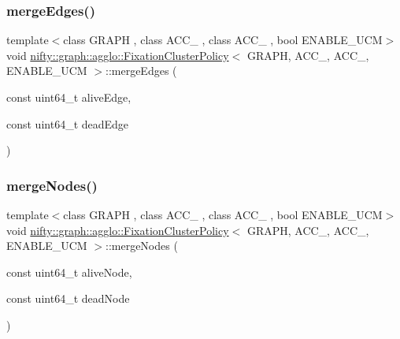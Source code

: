 \mbox{\label{classnifty_1_1graph_1_1agglo_1_1FixationClusterPolicy_a0dab460de96a588b52090cc3d57a6f31}} 
\subsubsection{\texorpdfstring{merge\+Edges()}{mergeEdges()}}
{\footnotesize\ttfamily template$<$class G\+R\+A\+PH , class A\+C\+C\+\_ , class A\+C\+C\+\_ , bool E\+N\+A\+B\+L\+E\+\_\+\+U\+CM$>$ \\
void \hyperlink{classnifty_1_1graph_1_1agglo_1_1FixationClusterPolicy}{nifty\+::graph\+::agglo\+::\+Fixation\+Cluster\+Policy}$<$ G\+R\+A\+PH, A\+C\+C\+\_, A\+C\+C\+\_, E\+N\+A\+B\+L\+E\+\_\+\+U\+CM $>$\+::merge\+Edges (\begin{DoxyParamCaption}\item[{const uint64\+\_\+t}]{alive\+Edge,  }\item[{const uint64\+\_\+t}]{dead\+Edge }\end{DoxyParamCaption})\hspace{0.3cm}{\ttfamily [inline]}}

\mbox{\label{classnifty_1_1graph_1_1agglo_1_1FixationClusterPolicy_a8b8ff08799421e908f4c2d4b004816f3}} 
\subsubsection{\texorpdfstring{merge\+Nodes()}{mergeNodes()}}
{\footnotesize\ttfamily template$<$class G\+R\+A\+PH , class A\+C\+C\+\_ , class A\+C\+C\+\_ , bool E\+N\+A\+B\+L\+E\+\_\+\+U\+CM$>$ \\
void \hyperlink{classnifty_1_1graph_1_1agglo_1_1FixationClusterPolicy}{nifty\+::graph\+::agglo\+::\+Fixation\+Cluster\+Policy}$<$ G\+R\+A\+PH, A\+C\+C\+\_, A\+C\+C\+\_, E\+N\+A\+B\+L\+E\+\_\+\+U\+CM $>$\+::merge\+Nodes (\begin{DoxyParamCaption}\item[{const uint64\+\_\+t}]{alive\+Node,  }\item[{const uint64\+\_\+t}]{dead\+Node }\end{DoxyParamCaption})\hspace{0.3cm}{\ttfamily [inline]}}



